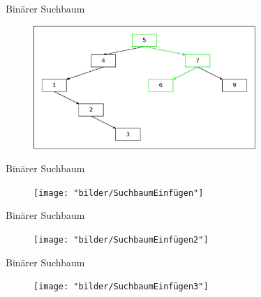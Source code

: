 \documentclass[11pt]{beamer}
\begin{document}
		\begin{frame}{Binärer Suchbaum}
			
			
			\begin{figure}[h]
				\centering
				\includegraphics[width=0.75\textwidth]{"bilder/binSuchSuchpfad2"}
				\label{fig:SuchbaumEinfügen}
			\end{figure}
		\end{frame}

		
		\begin{frame}{Binärer Suchbaum}
			
	
			\begin{figure}[h]
				\centering
				\texttt{[image: "bilder/SuchbaumEinfügen"]}
			\end{figure}
		\end{frame}



			\begin{frame}{Binärer Suchbaum}
			
			
			\begin{figure}[h]
				\centering
				\texttt{[image: "bilder/SuchbaumEinfügen2"]}
			\end{figure}
		\end{frame}
	
			\begin{frame}{Binärer Suchbaum}
			
			
			\begin{figure}[h]
				\centering
				\texttt{[image: "bilder/SuchbaumEinfügen3"]}
			\end{figure}
		\end{frame}
\end{document}
